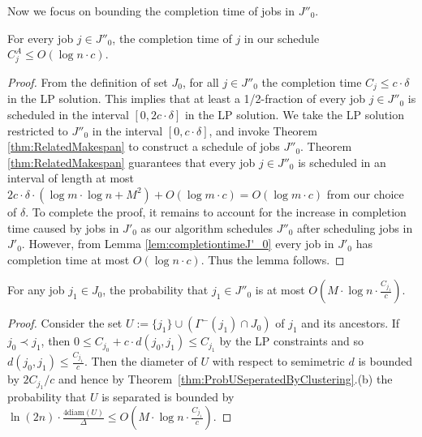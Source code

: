   
  
  Now we focus on bounding the completion time of jobs in $J''_0$. 
  
  \begin{lemma}
  \label{lem:completiontimeJ''_0}
  For every job $j \in J''_0$, the completion time of $j$ in our schedule $C^{A}_j \leq O( \log n \cdot c)$.
  \end{lemma}
  \begin{proof}
  From the definition of set $J_0$, for all $j \in J''_0$ the completion time $C_j \leq c \cdot \delta$ in the LP solution.
  This implies that at least a 1/2-fraction of every job $j \in J''_0$ is scheduled in the interval $[0, 2c \cdot \delta]$ in the LP solution.
  We take the LP solution restricted to $J''_0$ in the interval $[0, c \cdot \delta]$, and  invoke Theorem \ref{thm:RelatedMakespan} to construct a schedule of jobs $J''_0$.
  Theorem \ref{thm:RelatedMakespan} guarantees that every job  $j \in J''_0$ is scheduled in an interval of length at most $2c \cdot \delta \cdot (\log m \cdot \log n + M^2) + O(\log m \cdot c) = O(\log m \cdot c)$ from our choice of $\delta$.
  To complete the proof, it remains to account for the increase in completion time caused by jobs in  $J'_0$ as 
  our algorithm schedules $J''_0$ after scheduling jobs in $J'_0$.
  However, from Lemma \ref{lem:completiontimeJ'_0} every job in $J'_0$ has completion time at most $O(\log n \cdot c)$.
  Thus the lemma follows.
  \end{proof}
  
  \begin{lemma}\label{l:notin}
  For any job $j_1 \in J_0$, the probability that $j_1 \in J''_0$  is at most  $O(M \cdot \log n  \cdot \frac{C_{j_1}}{c})$.
  \end{lemma}
  \begin{proof}
    Consider the set $U := \{ j_1 \} \cup (\Gamma^{-}(j_1) \cap J_0)$ of $j_1$ and its ancestors. If $j_0 \prec j_1$, then $0 \leq C_{j_0} + c \cdot d(j_0,j_1) \leq C_{j_1}$ by the LP constraints and so $d(j_0,j_1) \leq \frac{C_{j_1}}{c}$.
    Then the diameter of $U$ with respect to semimetric $d$ is bounded by $2C_{j_1}/c$ and hence by Theorem~\ref{thm:ProbUSeperatedByClustering}.(b) the probability that $U$ is separated is bounded by $\ln(2n) \cdot \frac{4 \textrm{diam}(U)}{\Delta} \leq O(M \cdot \log n  \cdot \frac{C_{j_1}}{c})$.
  \end{proof}
  
